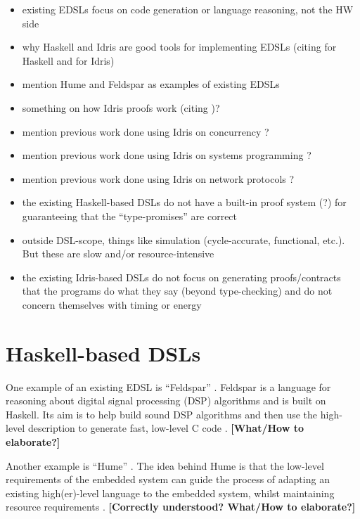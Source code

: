 \begin{itemize}
	\item existing EDSLs focus on code generation or language reasoning, not the
	      HW side
	\item why Haskell and Idris are good tools for implementing EDSLs (citing
    	  \cite{10.1007/3-540-45350-4_5,685738,hudak1996building} for Haskell
    	  and \cite{brady2015embedded} for Idris)
	\item mention Hume \cite{10.1007/978-3-540-39815-8_3} and Feldspar
  		  \cite{5558637} as examples of existing EDSLs
	\item something on how Idris proofs work (citing \cite{brady2015embedded})?
	\item mention previous work done using Idris on concurrency
		  \cite{brady2010correct}?
	\item mention previous work done using Idris on systems programming
		  \cite{10.1007/978-3-642-27694-1_18,Brady:2011:ISP:1929529.1929536}?
	\item mention previous work done using Idris on network protocols
		  \cite{5158855}?
	\item the existing Haskell-based DSLs do not have a built-in proof system
		  (?) for guaranteeing that the ``type-promises'' are correct
	\item outside DSL-scope, things like simulation (cycle-accurate, functional,
		  etc.). But these are slow and/or resource-intensive
	\item the existing Idris-based DSLs do not focus on generating
		  proofs/contracts that the programs do what they say (beyond
		  type-checking) and do not concern themselves with timing or energy
\end{itemize}

\section{Haskell-based DSLs}
	One example of an existing EDSL is ``Feldspar'' \cite{5558637}. Feldspar is a language for reasoning about digital signal processing (DSP) algorithms and is built on Haskell. Its aim is to help build sound DSP algorithms and then use the high-level description to generate fast, low-level C code \cite{5558637}. \textbf{[What/How to elaborate?]}
	
	Another example is ``Hume'' \cite{10.1007/978-3-540-39815-8_3}. The idea behind Hume is that the low-level requirements of the embedded system can guide the process of adapting an existing high(er)-level language to the embedded system, whilst maintaining resource requirements \cite{10.1007/978-3-540-39815-8_3}. \textbf{[Correctly understood? What/How to elaborate?]}

